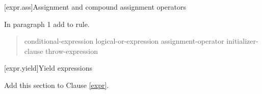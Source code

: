 %	
%

\setcounter{section}{17}
[expr.ass]{Assignment and compound assignment operators}%

In paragraph 1 add  to  rule.

\begin{quote}
\begin{bnf}
  \br
  conditional-expression\br
  logical-or-expression assignment-operator initializer-clause\br
  throw-expression \br
\end{bnf}
\end{quote}

\setcounter{section}{20}
[expr.yield]{Yield expressions}%

Add this section to Clause \ref{expr}.

